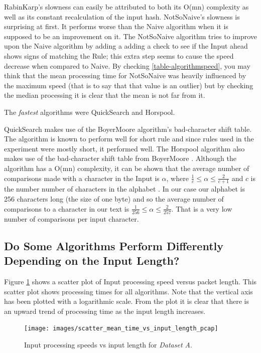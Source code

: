\documentclass[11pt]{article}
\begin{document}
RabinKarp's \citep{karp1987} slowness can easily be attributed to both its O(mn) complexity as well as its constant recalculation of the input hash. 
NotSoNaive's \citep{hancart1993} slowness is surprising at first. It performs worse than the Naive algorithm when it is supposed to be an improvement on it. The NotSoNaive algorithm tries to improve upon the Naive algorithm by adding a adding a check to see if the Input ahead shows signs of matching the Rule; this extra step seems to cause the speed decrease when compared to Naive. By checking \ref{table-algorithmspeed}, you may think that the mean processing time for NotSoNaive was heavily influenced by the maximum speed (that is to say that that value is an outlier) but by checking the median processing it is clear that the mean is not far from it.

The \textit{fastest} algorithms were QuickSearch and Horspool.

QuickSearch \citep{sunday1990} makes use of the BoyerMoore \citep{boyer1977} algorithm's bad-character shift table. The algorithm is known to perform well for short rule \citep{leqroc1995} and since rules used in the experiment were mostly short, it performed well.
The Horspool \citep{horspool1980} algorithm also makes use of the bad-character shift table from BoyerMoore \citep{boyer1977}. Although the algorithm has a O(mn) complexity, it can be shown that the average number of comparisons made with a character in the Input is $\alpha$, where $\frac{1}{c} \leq \alpha \leq \frac{2}{c+1}$ and $c$ is the number number of characters in the alphabet \citep{baezayates1992b}. In our case our alphabet is 256 characters long (the size of one byte) and so the average number of comparisons to a character in our text is $\frac{1}{256} \leq \alpha \leq \frac{2}{257}$. That is a very low number of comparisons per input character.

\subsection{Do Some Algorithms Perform Differently Depending on the Input Length?}

Figure \ref{figure-speedvslength} shows a scatter plot of Input processing speed versus packet length. This scatter plot shows processing times for all algorithms. Note that the vertical axis has been plotted with a logarithmic scale. From the plot it is clear that there is an upward trend of processing time as the input length increases.

\begin{figure}[t]
    \centering
    \texttt{[image: images/scatter\_mean\_time\_vs\_input\_length\_pcap]}
    \caption{Input processing speeds vs input length for \textit{Dataset A}.}
    \label{figure-speedvslength}
\end{figure}
\end{document}

